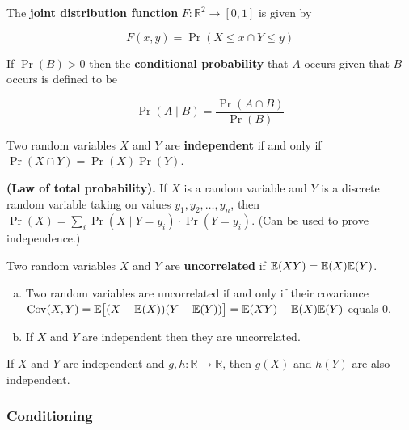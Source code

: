 \begin{definition}The \textbf{joint distribution function} \(F: \mathbb{R}^2 \to [0, 1]\) is given by

\[
F(x, y) = \Pr(X \leq x \cap Y \leq y)
\]\end{definition}

\begin{definition}If \(\Pr(B) > 0\) then the \textbf{conditional probability} that \(A\) occurs given that \(B\) occurs is defined to be

\[
\Pr(A \mid B) = \frac{\Pr(A \cap B)}{\Pr(B)}
\]\end{definition}

\begin{definition}Two random variables \(X\) and \(Y\) are \textbf{independent} if and only if \(\Pr(X \cap Y) = \Pr(X) \Pr(Y)\).\end{definition}

\begin{theorem} \textbf{(Law of total probability).} If \(X\) is a random variable and \(Y\) is a discrete random variable taking on values \(y_1, y_2, \ldots, y_n\), then \(\Pr(X) = \sum_i \Pr(X \mid Y = y_i) \cdot \Pr(Y = y_i)\). (Can be used to prove independence.)\end{theorem}

\begin{definition}Two random variables \(X\) and \(Y\) are \textbf{uncorrelated} if \(\E(XY) = \E(X) \E(Y)\).\end{definition} 

\begin{proposition}
\begin{enumerate}[(a)]
\item Two random variables are uncorrelated if and only if their covariance \(\Cov(X, Y) = \E \big[(X - \E(X))(Y - \E(Y))\big] = \E(XY) - \E(X)\E(Y)\)  equals 0. 
\item If \(X\) and \(Y\) are independent then they are uncorrelated.
\end{enumerate}
\end{proposition}

\begin{theorem} If \(X\) and \(Y\) are independent and \(g, h: \mathbb{R} \to \mathbb{R}\), then \(g(X)\) and \(h(Y)\) are also independent. \end{theorem}

\subsubsection{Conditioning}

